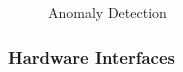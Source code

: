 \begin{figure}[htbp]
\begin{minipage}[c]{.45\textwidth}
		\caption{Anomaly Detection}
		\label{figura10}
	\end{minipage}
\end{figure}
{\color{Blue}\subsubsection{Hardware Interfaces}}
